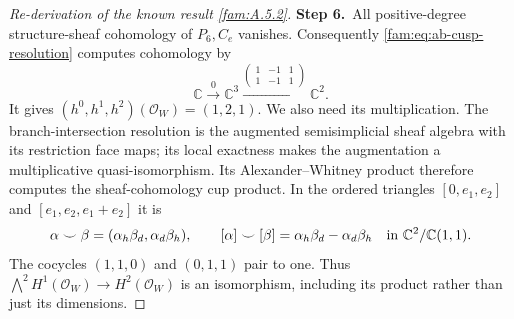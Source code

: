 \begin{proof}[Re-derivation of the known result \ref{fam:A.5.2}]
\par\smallskip\noindent\textbf{Step 6.}\ All positive-degree structure-sheaf cohomology of $P_6,C_e$ vanishes.
Consequently \eqref{fam:eq:ab-cusp-resolution} computes cohomology by
\[
 \mathbb C\xrightarrow{0}\mathbb C^3
 \xrightarrow{\left(\begin{smallmatrix}1&-1&1\\1&-1&1\end{smallmatrix}\right)}
 \mathbb C^2.
\]
It gives $(h^0,h^1,h^2)(\mathcal O_W)=(1,2,1)$.
We also need its multiplication. The branch-intersection resolution
is the augmented semisimplicial sheaf algebra with its restriction face
maps; its local exactness makes the augmentation a multiplicative
quasi-isomorphism. Its Alexander--Whitney product therefore computes
the sheaf-cohomology cup product. In the ordered triangles
$[0,e_1,e_2]$ and $[e_1,e_2,e_1+e_2]$ it is
\[
 \alpha\smile\beta=(\alpha_h\beta_d,\alpha_d\beta_h),
 \qquad [\alpha]\smile[\beta]
 =\alpha_h\beta_d-\alpha_d\beta_h
 \quad\hbox{in }\mathbb C^2/\mathbb C(1,1).
\]
The cocycles $(1,1,0)$ and $(0,1,1)$ pair to one. Thus
$\bigwedge^2H^1(\mathcal O_W)\to H^2(\mathcal O_W)$ is an
isomorphism, including its product rather than just its dimensions.


\end{proof}
